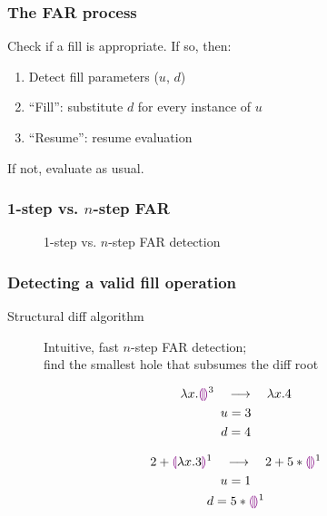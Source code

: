 \documentclass{beamer}
\begin{document}
\begin{frame}
  \frametitle{The FAR process}

  Check if a fill is appropriate. If so, then:

  \begin{enumerate}
  \item Detect fill parameters ($u$, $d$)
  \item ``Fill'': substitute $d$ for every instance of $u$
  \item ``Resume'': resume evaluation
  \end{enumerate}

  If not, evaluate as usual.
\end{frame}

\begin{frame}
  \frametitle{1-step vs. $n$-step FAR}

  \begin{figure}
    \centering
    \maxsizebox{\textwidth}{15em}{
      
    }
    \caption{1-step vs. $n$-step FAR detection}
    \label{fig:one-vs-n-step-far}
  \end{figure}
\end{frame}

\begin{frame}
  \frametitle{Detecting a valid fill operation}

  \begin{description}
  \item[Structural diff algorithm] Intuitive, fast $n$-step FAR detection; \\
    find the smallest hole that subsumes the diff root
  \end{description}

  \begin{gather*}
    \lambda x.\textcolor{violet}{\llparenthesis}\textcolor{violet}{\rrparenthesis}^3\ \ \ \longrightarrow\ \ \ \lambda x.4 \\
    u=3 \\
    d=4
  \end{gather*}

  \begin{gather*}
    2+\textcolor{violet}{\llparenthesis}\lambda x.3\textcolor{violet}{\rrparenthesis}^1\ \ \ \longrightarrow\ \ \ 2+5*\textcolor{violet}{\llparenthesis}\textcolor{violet}{\rrparenthesis}^1 \\
    u=1 \\
    d=5*\textcolor{violet}{\llparenthesis}\textcolor{violet}{\rrparenthesis}^1
  \end{gather*}
\end{frame}
\end{document}
